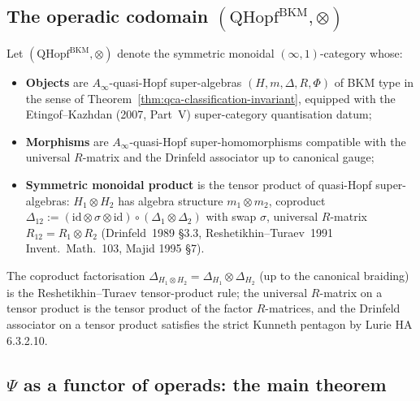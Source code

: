 \subsection{The operadic codomain \texorpdfstring{$(\mathrm{QHopf}^{\mathrm{BKM}}, \otimes)$}{(QHopf-BKM, (x))}}
\label{subsec:phiutp-operadic-codomain}

\begin{definition}
\label{def:phiutp-operadic-codomain}
Let $(\mathrm{QHopf}^{\mathrm{BKM}}, \otimes)$ denote the symmetric
monoidal $(\infty,1)$-category whose:
\begin{itemize}
 \item \textbf{Objects} are $A_\infty$-quasi-Hopf super-algebras
 $(H, m, \Delta, R, \Phi)$ of BKM type in the sense of
 Theorem~\ref{thm:qca-classification-invariant}, equipped with
 the Etingof--Kazhdan (2007, Part~V) super-category quantisation
 datum;
 \item \textbf{Morphisms} are $A_\infty$-quasi-Hopf super-homomorphisms
 compatible with the universal $R$-matrix and the Drinfeld
 associator up to canonical gauge;
 \item \textbf{Symmetric monoidal product} is the tensor product of
 quasi-Hopf super-algebras:
 $H_1 \otimes H_2$ has algebra structure $m_1 \otimes m_2$,
 coproduct $\Delta_{12} := (\mathrm{id} \otimes \sigma \otimes \mathrm{id})
 \circ (\Delta_1 \otimes \Delta_2)$ with swap $\sigma$, universal
 $R$-matrix $R_{12} = R_1 \otimes R_2$ (Drinfeld~1989 \S3.3,
 Reshetikhin--Turaev~1991 Invent.\ Math.\ 103, Majid 1995 \S7).
\end{itemize}
\end{definition}

The coproduct factorisation
$\Delta_{H_1 \otimes H_2} = \Delta_{H_1} \otimes \Delta_{H_2}$ (up to the
canonical braiding) is the Reshetikhin--Turaev tensor-product rule;
the universal $R$-matrix on a tensor product is the tensor product of
the factor $R$-matrices, and the Drinfeld associator on a tensor
product satisfies the strict Kunneth pentagon by Lurie HA 6.3.2.10.

\subsection{\texorpdfstring{$\Psi$}{Psi} as a functor of operads: the main theorem}
\label{subsec:phiutp-psi-functor-theorem}

